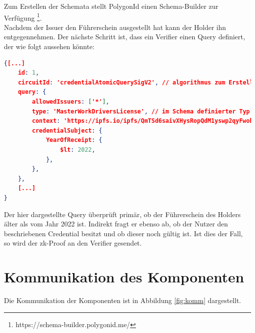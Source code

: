 Zum Erstellen der Schemata stellt PolygonId einen Schema-Builder zur Verfügung \footnote{https://schema-builder.polygonid.me/}. \\
Nachdem der Issuer den Führerschein ausgestellt hat kann der Holder ihn entgegennehmen. Der nächste Schritt ist, dass ein Verifier einen Query definiert, der wie folgt aussehen könnte:
\begin{lstlisting}[language=json,firstnumber=1]
{[...]
	id: 1,
	circuitId: 'credentialAtomicQuerySigV2', // algorithmus zum Erstellen des zk-Proofs
	query: {
		allowedIssuers: ['*'],
		type: 'MasterWorkDriversLicense', // im Schema definierter Typ
		context: 'https://ipfs.io/ipfs/QmTSd6saivXHysRopQdM1yswp2qyFwobL7fwuFpkVTS8gd',
		credentialSubject: {
			YearOfReceipt: {
				$lt: 2022,
			},
		},
	},
	[...]
}
\end{lstlisting}
Der hier dargestellte Query überprüft primär, ob der Führerschein des Holders älter als vom Jahr 2022 ist. Indirekt fragt er ebenso ab, ob der Nutzer den beschriebenen Credential besitzt und ob dieser noch gültig ist. Ist dies der Fall, so wird der zk-Proof an den Verifier gesendet.

\section{Kommunikation des Komponenten}
Die Kommunikation der Komponenten ist in Abbildung \ref{fig:komm} dargestellt.

